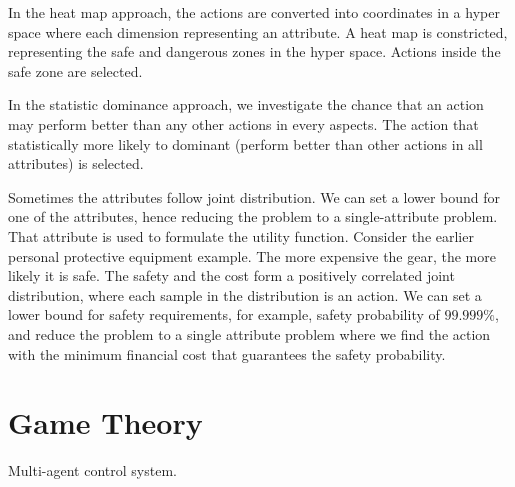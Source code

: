 In the heat map approach, the actions are converted into coordinates in a hyper space where each dimension representing an attribute. A heat map is constricted, representing the safe and dangerous zones in the hyper space. Actions inside the safe zone are selected.

In the statistic dominance approach, we investigate the chance that an action may perform better than any other actions in every aspects. The action that statistically more likely to dominant (perform better than other actions in all attributes) is selected.

Sometimes the attributes follow joint distribution. We can set a lower bound for one of the attributes, hence reducing the problem to a single-attribute problem. That attribute is used to formulate the utility function. Consider the earlier personal protective equipment example. The more expensive the gear, the more likely it is safe. The safety and the cost form a positively correlated joint distribution, where each sample in the distribution is an action. We can set a lower bound for safety requirements, for example, safety probability of $99.999\%$, and reduce the problem to a single attribute problem where we find the action with the minimum financial cost that guarantees the safety probability.

\section{Game Theory}

Multi-agent control system.